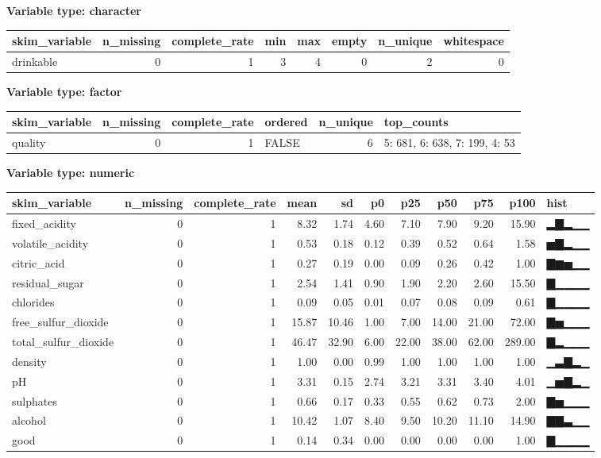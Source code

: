 \documentclass[
]{article}
\begin{document}
\textbf{Variable type: character}

\begin{longtable}[]{@{}lrrrrrrr@{}}
\toprule
skim\_variable & n\_missing & complete\_rate & min & max & empty &
n\_unique & whitespace \\
\midrule
\endhead
drinkable & 0 & 1 & 3 & 4 & 0 & 2 & 0 \\
\bottomrule
\end{longtable}

\textbf{Variable type: factor}

\begin{longtable}[]{@{}lrrlrl@{}}
\toprule
skim\_variable & n\_missing & complete\_rate & ordered & n\_unique &
top\_counts \\
\midrule
\endhead
quality & 0 & 1 & FALSE & 6 & 5: 681, 6: 638, 7: 199, 4: 53 \\
\bottomrule
\end{longtable}

\textbf{Variable type: numeric}

\begin{longtable}[]{@{}lrrrrrrrrrl@{}}
\toprule
skim\_variable & n\_missing & complete\_rate & mean & sd & p0 & p25 &
p50 & p75 & p100 & hist \\
\midrule
\endhead
fixed\_acidity & 0 & 1 & 8.32 & 1.74 & 4.60 & 7.10 & 7.90 & 9.20 & 15.90
& ▂▇▂▁▁ \\
volatile\_acidity & 0 & 1 & 0.53 & 0.18 & 0.12 & 0.39 & 0.52 & 0.64 &
1.58 & ▅▇▂▁▁ \\
citric\_acid & 0 & 1 & 0.27 & 0.19 & 0.00 & 0.09 & 0.26 & 0.42 & 1.00 &
▇▆▅▁▁ \\
residual\_sugar & 0 & 1 & 2.54 & 1.41 & 0.90 & 1.90 & 2.20 & 2.60 &
15.50 & ▇▁▁▁▁ \\
chlorides & 0 & 1 & 0.09 & 0.05 & 0.01 & 0.07 & 0.08 & 0.09 & 0.61 &
▇▁▁▁▁ \\
free\_sulfur\_dioxide & 0 & 1 & 15.87 & 10.46 & 1.00 & 7.00 & 14.00 &
21.00 & 72.00 & ▇▅▁▁▁ \\
total\_sulfur\_dioxide & 0 & 1 & 46.47 & 32.90 & 6.00 & 22.00 & 38.00 &
62.00 & 289.00 & ▇▂▁▁▁ \\
density & 0 & 1 & 1.00 & 0.00 & 0.99 & 1.00 & 1.00 & 1.00 & 1.00 &
▁▃▇▂▁ \\
pH & 0 & 1 & 3.31 & 0.15 & 2.74 & 3.21 & 3.31 & 3.40 & 4.01 & ▁▅▇▂▁ \\
sulphates & 0 & 1 & 0.66 & 0.17 & 0.33 & 0.55 & 0.62 & 0.73 & 2.00 &
▇▅▁▁▁ \\
alcohol & 0 & 1 & 10.42 & 1.07 & 8.40 & 9.50 & 10.20 & 11.10 & 14.90 &
▇▇▃▁▁ \\
good & 0 & 1 & 0.14 & 0.34 & 0.00 & 0.00 & 0.00 & 0.00 & 1.00 & ▇▁▁▁▁ \\
\bottomrule
\end{longtable}
\end{document}
